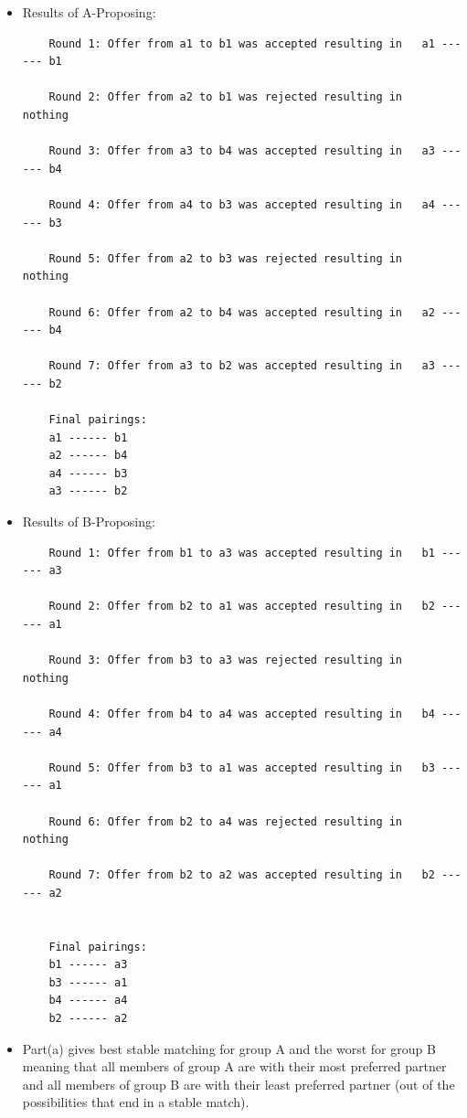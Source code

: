 \documentclass[12pt]{article}
\begin{document}
\begin{itemize}
    \item[a)] Results of A-Proposing:
    \begin{verbatim}
    Round 1: Offer from a1 to b1 was accepted resulting in   a1 ------ b1
    
    Round 2: Offer from a2 to b1 was rejected resulting in   nothing
    
    Round 3: Offer from a3 to b4 was accepted resulting in   a3 ------ b4
    
    Round 4: Offer from a4 to b3 was accepted resulting in   a4 ------ b3
    
    Round 5: Offer from a2 to b3 was rejected resulting in   nothing
    
    Round 6: Offer from a2 to b4 was accepted resulting in   a2 ------ b4
    
    Round 7: Offer from a3 to b2 was accepted resulting in   a3 ------ b2
    
    Final pairings: 
    a1 ------ b1
    a2 ------ b4
    a4 ------ b3
    a3 ------ b2
    \end{verbatim}

    \item[b)] Results of B-Proposing:
    \begin{verbatim}
    Round 1: Offer from b1 to a3 was accepted resulting in   b1 ------ a3

    Round 2: Offer from b2 to a1 was accepted resulting in   b2 ------ a1
    
    Round 3: Offer from b3 to a3 was rejected resulting in   nothing
    
    Round 4: Offer from b4 to a4 was accepted resulting in   b4 ------ a4
    
    Round 5: Offer from b3 to a1 was accepted resulting in   b3 ------ a1
    
    Round 6: Offer from b2 to a4 was rejected resulting in   nothing
    
    Round 7: Offer from b2 to a2 was accepted resulting in   b2 ------ a2
    
    
    Final pairings: 
    b1 ------ a3
    b3 ------ a1
    b4 ------ a4
    b2 ------ a2
    \end{verbatim}

   \item[c)] Part(a) gives best stable matching for group A and the worst for group B meaning that all members of group A are with their most preferred partner and all members of group B are with their least preferred partner (out of the possibilities that end in a stable match).


\end{itemize}
\end{document}
